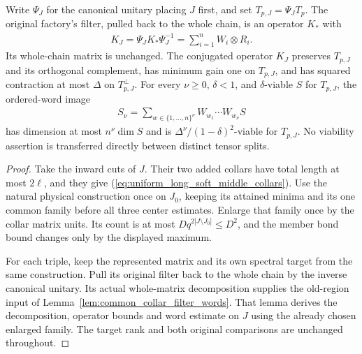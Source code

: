\begin{lemma}
    Write $\Psi_J$ for the canonical unitary placing $J$ first, and
    set $T_{p,J}=\Psi_JT_p$. The original factory's filter, pulled
    back to the whole chain, is an operator $K_*$ with
    \begin{align}
        K_J=\Psi_JK_*\Psi_J^{-1}=\sum_{i=1}^n W_i\otimes R_i.
    \end{align}
    Its whole-chain matrix is unchanged. The conjugated operator $K_J$ preserves
    $T_{p,J}$ and its orthogonal complement, has minimum gain one
    on $T_{p,J}$, and has squared contraction at most $\Delta$ on
    $T_{p,J}^\perp$.
    For every $\nu\ge0$, $\delta<1$, and $\delta$-viable $S$ for
    $T_{p,J}$, the ordered-word image
    \begin{align}
        S_\nu=\sum_{w\in\{1,\ldots,n\}^\nu}W_{w_1}\cdots W_{w_\nu}S
    \end{align}
    has dimension at most $n^\nu\dim S$ and is
    $\Delta^\nu/(1-\delta)^2$-viable for $T_{p,J}$.
    No viability assertion is transferred directly between distinct
    tensor splits.
\end{lemma}
\begin{proof}\leanok
    Take the inward cuts of $J$. Their two added collars have total
    length at most $2\ell$, and they give
    (\ref{eq:uniform_long_soft_middle_collars}). Use the natural
    physical construction once on $J_0$, keeping its attained minima
    and its one common family before all three center estimates.
    Enlarge that family once by the collar matrix units.
    Its count is at most $Dq^{2|J\setminus J_0|}\le D^2$,
    and the member bond bound changes only by the displayed maximum.

    For each triple, keep the represented matrix and its own spectral
    target from the same construction. Pull its original filter back
    to the whole chain by the inverse canonical unitary. Its actual
    whole-matrix decomposition supplies the old-region input of
    Lemma~\ref{lem:common_collar_filter_words}. That lemma derives the
    decomposition, operator bounds and word estimate on $J$ using the
    already chosen enlarged family. The target rank and both original
    comparisons are unchanged throughout.
\end{proof}

